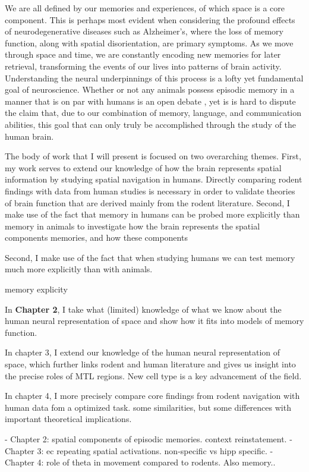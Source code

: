 We are all defined by our memories and experiences, of which space is a core component. This is perhaps most evident when considering the profound effects of neurodegenerative diseases such as Alzheimer's, where the loss of memory function, along with spatial disorientation, are primary symptoms. As we move through space and time, we are constantly encoding new memories for later retrieval, transforming the events of our lives into patterns of brain activity. Understanding the neural underpinnings of this process is a lofty yet fundamental goal of neuroscience.
Whether or not any animals possess episodic memory in a manner that is on par with humans is an open debate \citep{ClayEtal03}, yet is is hard to dispute the claim that, due to our combination of memory, language, and communication abilities, this goal that can only truly be accomplished through the study of the human brain.

The body of work that I will present is focused on two overarching themes. First, my work serves to extend our knowledge of how the brain represents spatial information by studying spatial navigation in humans. Directly comparing rodent findings with data from human studies is necessary in order to validate theories of brain function that are derived mainly from the rodent literature. Second, I make use of the fact that memory in humans can be probed more explicitly than memory in animals to investigate how the brain represents the spatial components memories, and how these components 

Second, I make use of the fact that when studying humans we can test memory much more explicitly than with animals.

memory explicity


In \textbf{Chapter 2}, I take what (limited) knowledge of what we know about the human neural representation of space and show how it fits into models of memory function.

In chapter 3, I extend our knowledge of the human neural representation of space, which further links rodent and human literature and gives us insight into the precise roles of MTL regions. New cell type is a key advancement of the field.

In chapter 4, I more precisely compare core findings from rodent navigation with human data fom a optimized task. some similarities, but some differences with important theoretical implications.

- Chapter 2: spatial components of episodic memories. context reinstatement.
- Chapter 3: ec repeating spatial activations. non-specific vs hipp specific.
- Chapter 4: role of theta in movement compared to rodents. Also memory..
